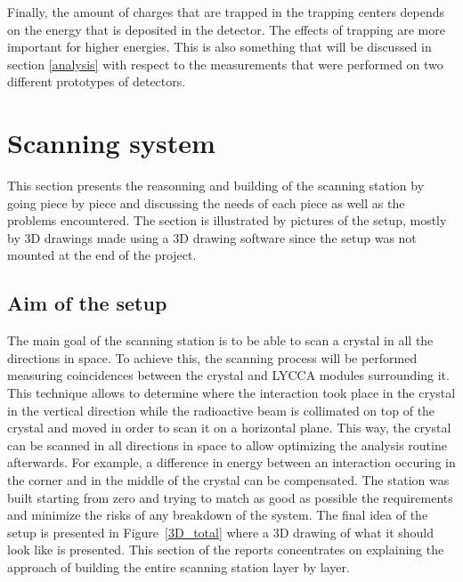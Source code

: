 \documentclass[11pt,a4paper]{article}
\begin{document}
Finally, the amount of charges that are trapped in the trapping centers depends on the energy that is deposited in the detector. The effects of trapping are more important for higher energies. This is also something that will be discussed in section \ref{analysis} with respect to the measurements that were performed on two different prototypes of detectors.

\newpage

\section{Scanning system} \label{scansystem}

This section presents the reasonning and building of the scanning station by going piece by piece and discussing the needs of each piece as well as the problems encountered. The section is illustrated by pictures of the setup, mostly by 3D drawings made using a 3D drawing software since the setup was not mounted at the end of the project.

\subsection{Aim of the setup}

The main goal of the scanning station is to be able to scan a crystal in all the directions in space. To achieve this, the scanning process will be performed measuring coincidences between the crystal and LYCCA \cite{LYCCA} modules surrounding it. This technique allows to determine where the interaction took place in the crystal in the vertical direction while the radioactive beam is collimated on top of the crystal and moved in order to scan it on a horizontal plane. This way, the crystal can be scanned in all directions in space to allow optimizing the analysis routine afterwards. For example, a difference in energy between an interaction occuring in the corner and in the middle of the crystal can be compensated. The station was built starting from zero and trying to match as good as possible the requirements and minimize the risks of any breakdown of the system. The final idea of the setup is presented in Figure~\ref{3D_total} where a 3D drawing of what it should look like is presented. This section of the reports concentrates on explaining the approach of building the entire scanning station layer by layer.
\end{document}
